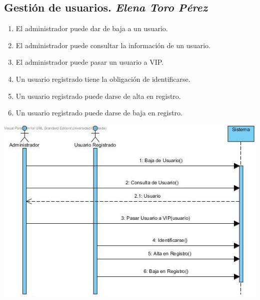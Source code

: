 \documentclass{article}
\begin{document}
	\subsection*{Gestión de usuarios. \textit{Elena Toro Pérez}}
		\begin{enumerate}
			\item El administrador puede dar de baja a un usuario.
    			\item El administrador puede consultar la información de un usuario.
    			\item El administrador puede pasar un usuario a VIP.
    			\item Un usuario registrado tiene la obligación de identificarse.
    			\item Un usuario registrado puede darse de alta en registro.
    			\item Un usuario registrado puede darse de baja en registro.
		\end{enumerate}
		\includegraphics[width=1\linewidth]{./S-Usuarios}
\end{document}
